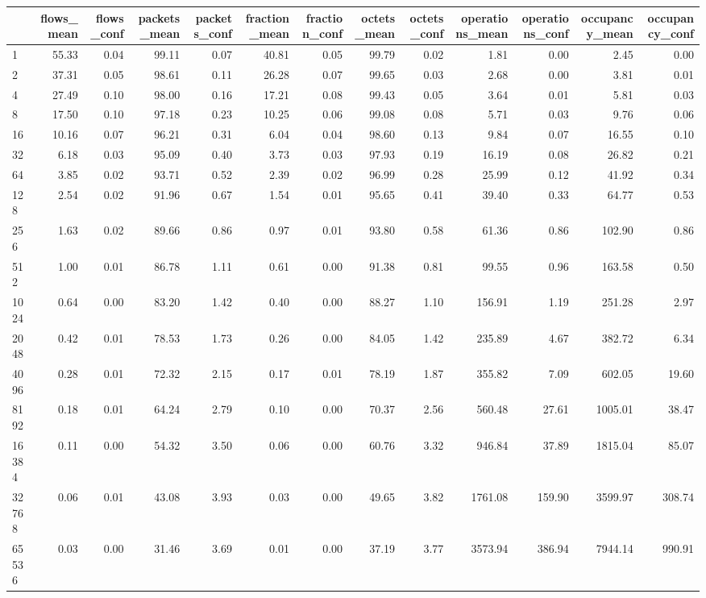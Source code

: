 \begin{tabular}{lrrrrrrrrrrrr}
\toprule
 & flows_mean & flows_conf & packets_mean & packets_conf & fraction_mean & fraction_conf & octets_mean & octets_conf & operations_mean & operations_conf & occupancy_mean & occupancy_conf \\
\midrule
1 & 55.33 & 0.04 & 99.11 & 0.07 & 40.81 & 0.05 & 99.79 & 0.02 & 1.81 & 0.00 & 2.45 & 0.00 \\
2 & 37.31 & 0.05 & 98.61 & 0.11 & 26.28 & 0.07 & 99.65 & 0.03 & 2.68 & 0.00 & 3.81 & 0.01 \\
4 & 27.49 & 0.10 & 98.00 & 0.16 & 17.21 & 0.08 & 99.43 & 0.05 & 3.64 & 0.01 & 5.81 & 0.03 \\
8 & 17.50 & 0.10 & 97.18 & 0.23 & 10.25 & 0.06 & 99.08 & 0.08 & 5.71 & 0.03 & 9.76 & 0.06 \\
16 & 10.16 & 0.07 & 96.21 & 0.31 & 6.04 & 0.04 & 98.60 & 0.13 & 9.84 & 0.07 & 16.55 & 0.10 \\
32 & 6.18 & 0.03 & 95.09 & 0.40 & 3.73 & 0.03 & 97.93 & 0.19 & 16.19 & 0.08 & 26.82 & 0.21 \\
64 & 3.85 & 0.02 & 93.71 & 0.52 & 2.39 & 0.02 & 96.99 & 0.28 & 25.99 & 0.12 & 41.92 & 0.34 \\
128 & 2.54 & 0.02 & 91.96 & 0.67 & 1.54 & 0.01 & 95.65 & 0.41 & 39.40 & 0.33 & 64.77 & 0.53 \\
256 & 1.63 & 0.02 & 89.66 & 0.86 & 0.97 & 0.01 & 93.80 & 0.58 & 61.36 & 0.86 & 102.90 & 0.86 \\
512 & 1.00 & 0.01 & 86.78 & 1.11 & 0.61 & 0.00 & 91.38 & 0.81 & 99.55 & 0.96 & 163.58 & 0.50 \\
1024 & 0.64 & 0.00 & 83.20 & 1.42 & 0.40 & 0.00 & 88.27 & 1.10 & 156.91 & 1.19 & 251.28 & 2.97 \\
2048 & 0.42 & 0.01 & 78.53 & 1.73 & 0.26 & 0.00 & 84.05 & 1.42 & 235.89 & 4.67 & 382.72 & 6.34 \\
4096 & 0.28 & 0.01 & 72.32 & 2.15 & 0.17 & 0.01 & 78.19 & 1.87 & 355.82 & 7.09 & 602.05 & 19.60 \\
8192 & 0.18 & 0.01 & 64.24 & 2.79 & 0.10 & 0.00 & 70.37 & 2.56 & 560.48 & 27.61 & 1005.01 & 38.47 \\
16384 & 0.11 & 0.00 & 54.32 & 3.50 & 0.06 & 0.00 & 60.76 & 3.32 & 946.84 & 37.89 & 1815.04 & 85.07 \\
32768 & 0.06 & 0.01 & 43.08 & 3.93 & 0.03 & 0.00 & 49.65 & 3.82 & 1761.08 & 159.90 & 3599.97 & 308.74 \\
65536 & 0.03 & 0.00 & 31.46 & 3.69 & 0.01 & 0.00 & 37.19 & 3.77 & 3573.94 & 386.94 & 7944.14 & 990.91 \\

\end{tabular}
